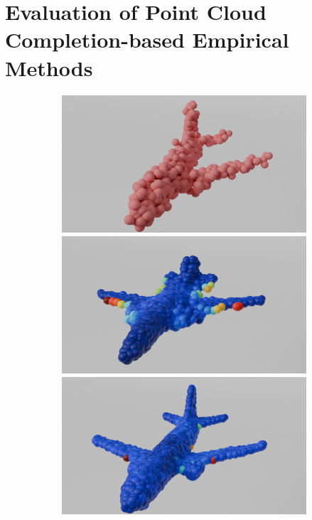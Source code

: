 \section{Evaluation of Point Cloud Completion-based Empirical Methods}
\begin{figure}[htb]
      \centering
      \begin{subfigure}[t]{\textwidth+20pt\relax}
        \includegraphics[width=\dimexpr\linewidth-20pt\relax]{figures/part_ap1.png}
        \includegraphics[width=\dimexpr\linewidth-20pt\relax]{figures/dc_lin_ap1.png}
        \includegraphics[width=\dimexpr\linewidth-20pt\relax]{figures/do_lin_ap1.png}

\end{subfigure}
\end{figure}
